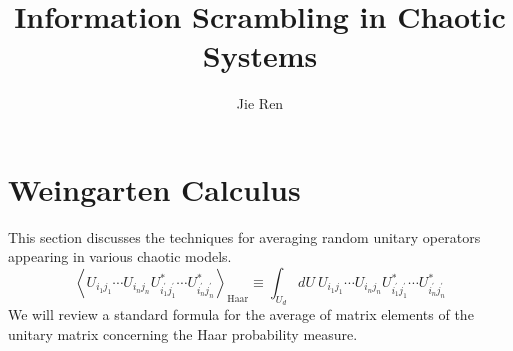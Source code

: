 \documentclass[aps,prb,superscriptaddress,nofootinbib]{revtex4}
\begin{document}
\title{Information Scrambling in Chaotic Systems}
\author{Jie Ren}



\maketitle


\tableofcontents

\section{Weingarten Calculus}

This section discusses the techniques for averaging random unitary operators appearing in various chaotic models.
\begin{equation}
	\left\langle U_{i_1 j_1} \cdots U_{i_n j_n} U_{i_1^{\prime} j_1^{\prime}}^* \cdots U_{i_n^{\prime} j_n^{\prime}}^* \right\rangle_\text{Haar}
	\equiv \int_{U_d} dU \ U_{i_1 j_1} \cdots U_{i_n j_n} U_{i_1^{\prime} j_1^{\prime}}^* \cdots U_{i_n^{\prime} j_n^{\prime}}^*
\end{equation}
We will review a standard formula for the average of matrix elements of the unitary matrix concerning the Haar probability measure.
\end{document}
